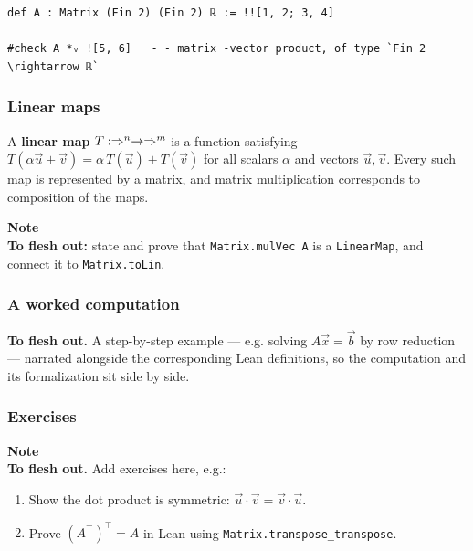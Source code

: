 \bigskip

\begin{verbatim}
def A : Matrix (Fin 2) (Fin 2) ℝ := !![1, 2; 3, 4]

#check A *ᵥ ![5, 6]   - - matrix -vector product, of type `Fin 2 \rightarrow ℝ`
\end{verbatim}

\subsubsection{Linear maps}

A \textbf{linear map} $T : \Rightarrow^n \to \Rightarrow^m$ is a function satisfying
$T(\alpha\vec{u} + \vec{v}) = \alpha\,T(\vec{u}) + T(\vec{v})$ for all scalars $\alpha$ and
vectors $\vec{u}, \vec{v}$. Every such map is represented by a matrix, and matrix
multiplication corresponds to composition of the maps.

\begin{framed}
\textbf{Note}\\
\textbf{To flesh out:} state and prove that \texttt{Matrix.mulVec A} is a \texttt{LinearMap}, and connect it to
\texttt{Matrix.toLin}.
\end{framed}

\subsubsection{A worked computation}

\textbf{To flesh out.} A step-by-step example --- e.g. solving $A\vec{x} = \vec{b}$ by row
reduction --- narrated alongside the corresponding Lean definitions, so the computation and its
formalization sit side by side.

\subsubsection{Exercises}

\begin{framed}
\textbf{Note}\\
\textbf{To flesh out.} Add exercises here, e.g.:

\begin{enumerate}
\item Show the dot product is symmetric: $\vec{u} \cdot \vec{v} = \vec{v} \cdot \vec{u}$.
\item Prove $(A^\top)^\top = A$ in Lean using \texttt{Matrix.transpose\_transpose}.
\end{enumerate}
\end{framed}